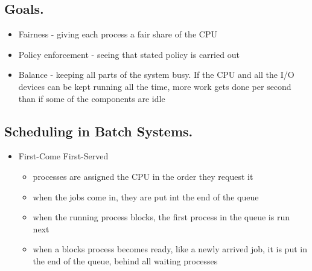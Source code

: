 \documentclass{article}
\begin{document}
\subsection*{Goals.}

\begin{itemize}
  \item Fairness - giving each process a fair share of the CPU 
  \item Policy enforcement - seeing that stated policy is carried out 
  \item Balance - keeping all parts of the system busy. If the CPU and all the I/O devices can be kept running all the time, more work gets done per second than if some of the components are idle
\end{itemize}

\subsection*{Scheduling in Batch Systems.}

\begin{itemize}
  \item First-Come First-Served 
    \begin{itemize}
      \item processes are assigned the CPU in the order they request it
      \item when the jobs come in, they are put int the end of the queue
      \item when the running process blocks, the first process in the queue is run next 
      \item when a blocks process becomes ready, like a newly arrived job, it is put in the end of the queue, behind all waiting processes
    \end{itemize}
\end{itemize}
\end{document}
